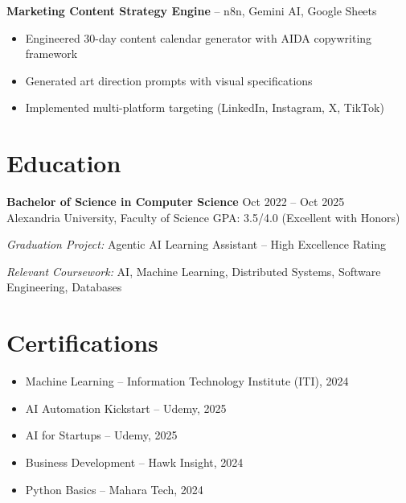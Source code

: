 \documentclass[11pt,a4paper]{article}
\begin{document}
\vspace{6pt}

\textbf{Marketing Content Strategy Engine} -- n8n, Gemini AI, Google Sheets
\begin{itemize}[leftmargin=0.5cm, itemsep=1pt, topsep=2pt, label={-}]
    \item Engineered 30-day content calendar generator with AIDA copywriting framework
    \item Generated art direction prompts with visual specifications
    \item Implemented multi-platform targeting (LinkedIn, Instagram, X, TikTok)
\end{itemize}

\section*{Education}

\textbf{Bachelor of Science in Computer Science} \hfill Oct 2022 -- Oct 2025\\
Alexandria University, Faculty of Science \hfill GPA: 3.5/4.0 (Excellent with Honors)

\vspace{2pt}

\textit{Graduation Project:} Agentic AI Learning Assistant -- High Excellence Rating

\vspace{2pt}

\textit{Relevant Coursework:} AI, Machine Learning, Distributed Systems, Software Engineering, Databases

\section*{Certifications}

\begin{itemize}[leftmargin=0.5cm, itemsep=-2pt, parsep=2.7pt, topsep=0pt, label={-}]
    \item Machine Learning -- Information Technology Institute (ITI), 2024
    \item AI Automation Kickstart -- Udemy, 2025
    \item AI for Startups -- Udemy, 2025
    \item Business Development -- Hawk Insight, 2024
    \item Python Basics -- Mahara Tech, 2024
\end{itemize}
\end{document}
